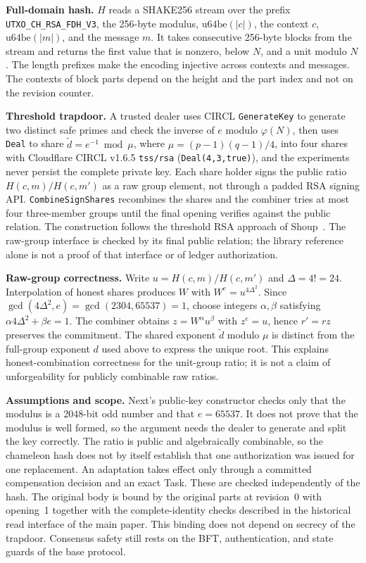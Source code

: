 \noindent\textbf{Full-domain hash.} $H$ reads a SHAKE256 stream over the prefix \texttt{UTXO\_CH\_RSA\_FDH\_V3}, the 256-byte modulus, $\mathrm{u64be}(|c|)$, the context $c$, $\mathrm{u64be}(|m|)$, and the message $m$. It takes consecutive 256-byte blocks from the stream and returns the first value that is nonzero, below $N$, and a unit modulo $N$. The length prefixes make the encoding injective across contexts and messages. The contexts of block parts depend on the height and the part index and not on the revision counter.

\noindent\textbf{Threshold trapdoor.} A trusted dealer uses CIRCL \texttt{GenerateKey} to generate two distinct safe primes and check the inverse of $e$ modulo $\varphi(N)$, then uses \texttt{Deal} to share $\widetilde d=e^{-1}\bmod\mu$, where $\mu=(p-1)(q-1)/4$, into four shares with Cloudflare CIRCL v1.6.5 \texttt{tss/rsa} (\texttt{Deal(4,3,true)}), and the experiments never persist the complete private key. Each share holder signs the public ratio $H(c,m)/H(c,m')$ as a raw group element, not through a padded RSA signing API. \texttt{CombineSignShares} recombines the shares and the combiner tries at most four three-member groups until the final opening verifies against the public relation. The construction follows the threshold RSA approach of Shoup~\cite{shoup}. The raw-group interface is checked by its final public relation; the library reference alone is not a proof of that interface or of ledger authorization.

\noindent\textbf{Raw-group correctness.} Write $u=H(c,m)/H(c,m')$ and $\Delta=4!=24$. Interpolation of honest shares produces $W$ with $W^e=u^{4\Delta^2}$. Since $\gcd(4\Delta^2,e)=\gcd(2304,65537)=1$, choose integers $\alpha,\beta$ satisfying $\alpha4\Delta^2+\beta e=1$. The combiner obtains $z=W^\alpha u^\beta$ with $z^e=u$, hence $r'=rz$ preserves the commitment. The shared exponent $\widetilde d$ modulo $\mu$ is distinct from the full-group exponent $d$ used above to express the unique root. This explains honest-combination correctness for the unit-group ratio; it is not a claim of unforgeability for publicly combinable raw ratios.

\noindent\textbf{Assumptions and scope.} Next's public-key constructor checks only that the modulus is a 2048-bit odd number and that $e=65537$. It does not prove that the modulus is well formed, so the argument needs the dealer to generate and split the key correctly. The ratio is public and algebraically combinable, so the chameleon hash does not by itself establish that one authorization was issued for one replacement. An adaptation takes effect only through a committed compensation decision and an exact Task. These are checked independently of the hash. The original body is bound by the original parts at revision~0 with opening~1 together with the complete-identity checks described in the historical read interface of the main paper. This binding does not depend on secrecy of the trapdoor. Consensus safety still rests on the BFT, authentication, and state guards of the base protocol.


